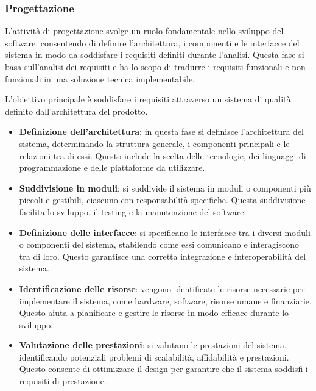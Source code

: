 \subsubsection{Progettazione}
L'attività di progettazione svolge un ruolo fondamentale nello sviluppo del software, consentendo di definire l'architettura, i componenti e le interfacce del sistema in modo da soddisfare i requisiti definiti durante l'analisi.  Questa fase si basa sull'analisi dei requisiti e ha lo scopo di tradurre i requisiti funzionali e non funzionali in una soluzione tecnica implementabile.

L'obiettivo principale è soddisfare i requisiti attraverso un sistema di qualità definito dall'architettura del prodotto. 
\begin{itemize}
	\item \textbf{Definizione dell'architettura}: in questa fase si definisce l'architettura del sistema, determinando la struttura generale, i componenti principali e le relazioni tra di essi. Questo include la scelta delle tecnologie, dei linguaggi di programmazione e delle piattaforme da utilizzare.
	\item \textbf{Suddivisione in moduli}: si suddivide il sistema in moduli o componenti più piccoli e gestibili, ciascuno con responsabilità specifiche. Questa suddivisione facilita lo sviluppo, il testing e la manutenzione del software.
	\item \textbf{Definizione delle interfacce}: si specificano le interfacce tra i diversi moduli o componenti del sistema, stabilendo come essi comunicano e interagiscono tra di loro. Questo garantisce una corretta integrazione e interoperabilità del sistema.
	\item \textbf{Identificazione delle risorse}: vengono identificate le risorse necessarie per implementare il sistema, come hardware, software, risorse umane e finanziarie. Questo aiuta a pianificare e gestire le risorse in modo efficace durante lo sviluppo.
	\item \textbf{Valutazione delle prestazioni}: si valutano le prestazioni del sistema, identificando potenziali problemi di scalabilità, affidabilità e prestazioni. Questo consente di ottimizzare il design per garantire che il sistema soddisfi i requisiti di prestazione.
\end{itemize}

